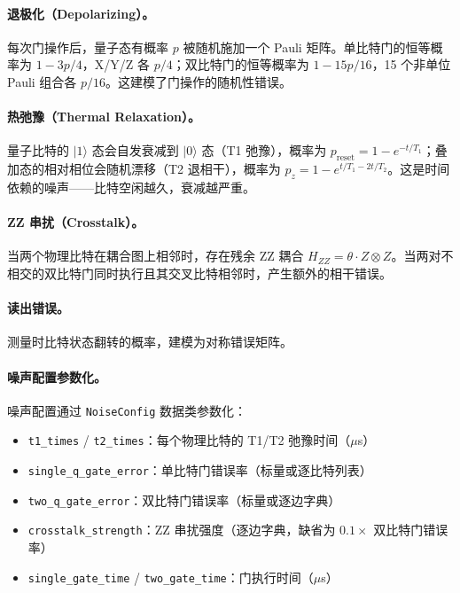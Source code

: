 \paragraph{退极化（Depolarizing）。} 每次门操作后，量子态有概率 $p$ 被随机施加一个 Pauli 矩阵。单比特门的恒等概率为 $1-3p/4$，X/Y/Z 各 $p/4$；双比特门的恒等概率为 $1-15p/16$，15 个非单位 Pauli 组合各 $p/16$。这建模了门操作的随机性错误。

\paragraph{热弛豫（Thermal Relaxation）。} 量子比特的 $|1\rangle$ 态会自发衰减到 $|0\rangle$ 态（T1 弛豫），概率为 $p_{\text{reset}} = 1 - e^{-t/T_1}$；叠加态的相对相位会随机漂移（T2 退相干），概率为 $p_z = 1 - e^{t/T_1 - 2t/T_2}$。这是时间依赖的噪声——比特空闲越久，衰减越严重。

\paragraph{ZZ 串扰（Crosstalk）。} 当两个物理比特在耦合图上相邻时，存在残余 ZZ 耦合 $H_{ZZ} = \theta \cdot Z \otimes Z$。当两对不相交的双比特门同时执行且其交叉比特相邻时，产生额外的相干错误。

\paragraph{读出错误。} 测量时比特状态翻转的概率，建模为对称错误矩阵。

\paragraph{噪声配置参数化。} 噪声配置通过 \texttt{NoiseConfig} 数据类参数化：

\begin{itemize}
  \item \texttt{t1\_times} / \texttt{t2\_times}：每个物理比特的 T1/T2 弛豫时间（$\mu$s）
  \item \texttt{single\_q\_gate\_error}：单比特门错误率（标量或逐比特列表）
  \item \texttt{two\_q\_gate\_error}：双比特门错误率（标量或逐边字典）
  \item \texttt{crosstalk\_strength}：ZZ 串扰强度（逐边字典，缺省为 $0.1 \times$ 双比特门错误率）
  \item \texttt{single\_gate\_time} / \texttt{two\_gate\_time}：门执行时间（$\mu$s）
\end{itemize}

